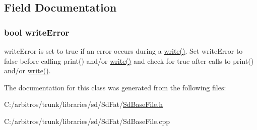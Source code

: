 \subsection{Field Documentation}
\hypertarget{class_sd_base_file_a800e5043596b8bec0dd32076d3c9750c}{
\subsubsection[{write\-Error}]{\setlength{\rightskip}{0pt plus 5cm}bool write\-Error}}\label{class_sd_base_file_a800e5043596b8bec0dd32076d3c9750c}
write\-Error is set to true if an error occurs during a \hyperlink{class_sd_base_file_aaf4f4cafe922e54d7b10c1b18bf60d07}{write()}. Set write\-Error to false before calling print() and/or \hyperlink{class_sd_base_file_aaf4f4cafe922e54d7b10c1b18bf60d07}{write()} and check for true after calls to print() and/or \hyperlink{class_sd_base_file_aaf4f4cafe922e54d7b10c1b18bf60d07}{write()}. 

The documentation for this class was generated from the following files\-:\begin{DoxyCompactItemize}
\item 
C\-:/arbitros/trunk/libraries/sd/\-Sd\-Fat/\hyperlink{_sd_base_file_8h}{Sd\-Base\-File.\-h}\item 
C\-:/arbitros/trunk/libraries/sd/\-Sd\-Fat/Sd\-Base\-File.\-cpp\end{DoxyCompactItemize}
